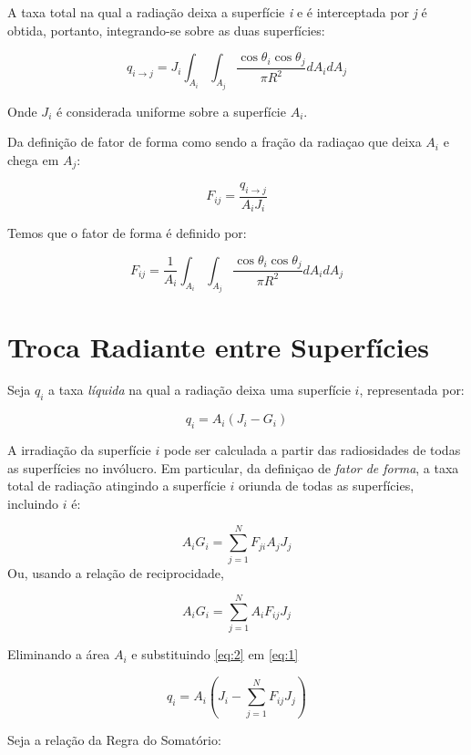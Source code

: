 A taxa total na qual a radiação deixa a superfície \textit{i} e é interceptada por \textit{j} é obtida, portanto, integrando-se sobre as duas superfícies:

\[
	q_{i \rightarrow j} = J_{i} \int _{A_{i}} \int _{A_{j}} \frac{\cos\theta_{i}\cos\theta_{j}}{\pi R^{2}}dA_{i}dA_{j} 
\] 

Onde $J_{i}$ é considerada uniforme sobre a superfície $A_{i}$.

Da definição de fator de forma como sendo a fração da radiaçao que deixa $A_{i}$ e chega em $A_{j}$:

\[F_{ij}=\frac{q_{i \rightarrow j}}{A_{i}J_{i}}\]

Temos que o fator de forma é definido por:

\[
	F_{ij} = \frac{1}{A_{i}} \int _{A_{i}} \int _{A_{j}} \frac{\cos\theta_{i}\cos\theta_{j}}{\pi R^{2}}dA_{i}dA_{j} 
\] 

\pagebreak

\section{Troca Radiante entre Superfícies}
Seja $q_{i}$ a taxa \textit{líquida} na qual a radiação deixa uma superfície $i$, representada por:

\begin{equation}
q_{i}=A_{i}(J_{i}-G_{i})
\label{eq:1}
\end{equation}

A irradiação da superfície $i$ pode ser calculada a partir das radiosidades de todas as superfícies no invólucro. Em particular, da definiçao de \textit{fator de forma}, a taxa total de radiação atingindo a superfície $i$ oriunda de todas as superfícies, incluindo $i$ é:

\[A_{i}G_{i}=\sum _{j=1}^{N}{F_{ji}A_{j}J_{j}}\]
Ou, usando a relação de reciprocidade, 

\begin{equation}
A_{i}G_{i}=\sum _{j=1}^{N}{A_{i}F_{ij}J_{j}}
\label{eq:2}
\end{equation}

Eliminando a área $A_{i}$ e substituindo \ref{eq:2} em \ref{eq:1}

\begin{equation}
q_{i}=A_{i}\left(  J_{i} - \sum _{j=1}^{N}{F_{ij}J_{j}}  \right)
\label{eq:3}
\end{equation}

Seja a relação da Regra do Somatório:

